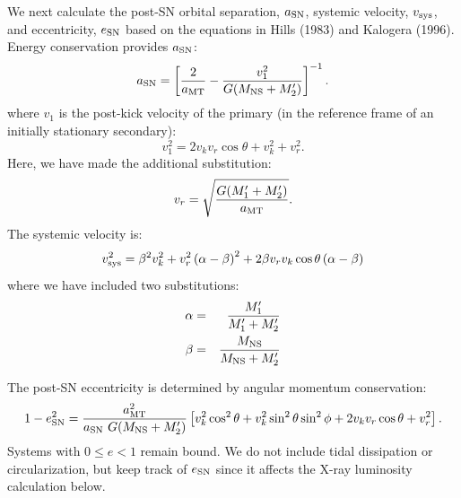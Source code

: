 \documentclass[12pt, preprint]{aastex}
\begin{document}
We next calculate the post-SN orbital separation, $a_{\rm SN}$, systemic velocity, $v_{\rm sys}$, and eccentricity, $e_{\rm SN}$ based on the equations in Hills (1983) and Kalogera (1996). Energy conservation provides $a_{\rm SN}$:
\begin{equation}
a_{\rm SN} = \left[ \frac{2 }{a_{\rm MT}}  - \frac{v_1^2}{G(M_{\rm NS} + M_2')} \right]^{-1}. \label{eq:SN_A} \\
\end{equation}
where $v_1$ is the post-kick velocity of the primary (in the reference frame of an initially stationary secondary):
\begin{equation}
v_1^2 = 2v_k v_r \cos \theta + v_k^2 + v_r^2. \label{eq:v_1}
\end{equation}
Here, we have made the additional substitution:
\begin{equation}
v_r = \sqrt{\frac{G (M_1' + M_2')}{a_{\rm MT}}}. \label{eq:v_r}
\end{equation}
The systemic velocity is:
\begin{equation}
v_{\rm sys}^2 = \beta^2 v_k^2
   + v_r^2 \left( \alpha - \beta \right)^2
   + 2 \beta v_r v_k \cos \theta \left( \alpha - \beta \right)
    \label{eq:SN_v_sys}
\end{equation}
where we have included two substitutions:
\begin{eqnarray}
\alpha &=& \frac{M_1'}{M_1' + M_2'} \\
\beta &=& \frac{M_{\rm NS}}{M_{\rm NS} + M_2'}
\end{eqnarray}


The post-SN eccentricity is determined by angular momentum conservation:
\begin{equation}
1-e_{\rm SN}^2 = \frac{a_{\rm MT}^2}{a_{\rm SN}\ G (M_{\rm NS} + M_2')} \left[ v_k^2 \cos^2\theta + v_k^2 \sin^2 \theta \sin^2 \phi + 2 v_k v_r \cos \theta + v_r^2  \right]. \label{eq:SN_e}
\end{equation}
Systems with $0 \leq e < 1$ remain bound. We do not include tidal dissipation or circularization, but keep track of $e_{\rm SN}$ since it affects the X-ray luminosity calculation below.
\end{document}
